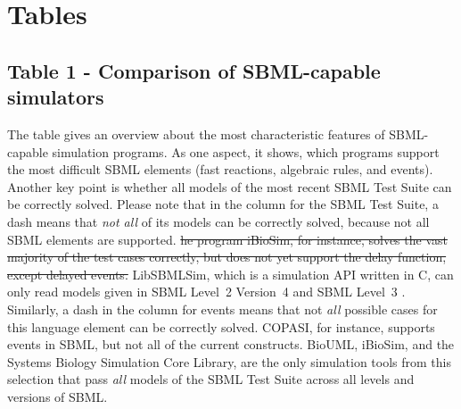 \documentclass[10pt]{bmc_article}
\newenvironment{bmcformat}{\fussy\setboolean{publ}{true}}{\fussy}
\begin{document}
\begin{bmcformat}
{%

\section*{Tables}

\subsection*{Table 1 - Comparison of SBML-capable simulators}
The table gives an overview about the most characteristic features of
\acs{SBML}-capable simulation programs. As one aspect, it shows, which programs
support the most difficult \acs{SBML} elements (fast reactions, algebraic rules,
and events). Another key point is whether all models of the most recent SBML Test
Suite  can be correctly solved.
Please note that in the column for the SBML Test Suite, a dash means that
\emph{not all} of its models can be correctly solved, because not all \acs{SBML}
elements are supported.
\sout{he program iBioSim, for instance, solves the vast
majority of the test cases correctly, but does not yet support the delay function,
except delayed events.}
LibSBMLSim, which is a simulation \acs{API} written in C, can only read models given
in \acs{SBML} Level~2 Version~4 and \acs{SBML} Level~3
.
Similarly, a dash in the column for events means that not \emph{all} possible
cases for this language element can be correctly solved.
COPASI, for instance, supports events in \acs{SBML}, but not all of the current 
constructs.
BioUML, iBioSim, and the Systems Biology Simulation Core Library, are the 
only simulation tools from this selection that pass \emph{all} models of the
SBML Test Suite across all levels and versions of \acs{SBML}.

}
\end{bmcformat}
\end{document}
